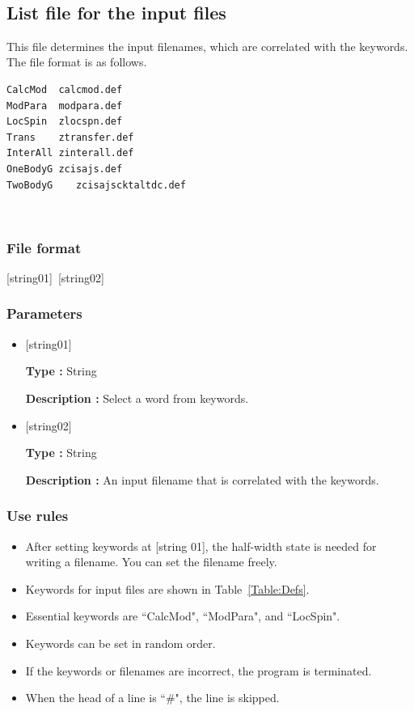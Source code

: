 ~\subsection{List file for the input files}
\label{Subsec:InputFileList}
This file determines the input filenames, which are correlated with the keywords. The file format is as follows.\\
\begin{minipage}{10cm}
\begin{screen}
\begin{verbatim}
CalcMod  calcmod.def
ModPara  modpara.def
LocSpin  zlocspn.def
Trans    ztransfer.def
InterAll zinterall.def
OneBodyG zcisajs.def
TwoBodyG	zcisajscktaltdc.def
\end{verbatim}
\end{screen}
\end{minipage}
\\
\subsubsection{File format}
[string01]~[string02]
\subsubsection{Parameters}
 \begin{itemize}
   \item  $[$string01$]$
   
   {\bf Type :} String
   
   {\bf Description :} Select a word from keywords.
   
   \item  $[$string02$]$
   
    {\bf Type :} String 

   {\bf Description :} An input filename that is correlated with the keywords.
 \end{itemize}
\subsubsection{Use rules}
\begin{itemize}
\item  After setting keywords at [string 01], the half-width state is needed for writing a filename. You can set the filename freely.
\item Keywords for input files are shown in Table~\ref{Table:Defs}.
\item Essential keywords are ``CalcMod", ``ModPara", and ``LocSpin".
\item Keywords can be set in random order.
\item If the keywords or filenames are incorrect, the program is terminated. 
\item When the head of a line is ``$\#$", the line is skipped.
\end{itemize}

